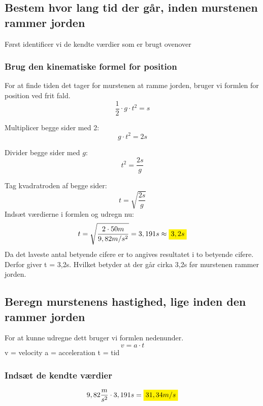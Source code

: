 \subsection{Bestem hvor lang tid der går, inden murstenen rammer jorden}

Først identificer vi de kendte værdier som er brugt ovenover

\subsubsection{Brug den kinematiske formel for position}
For at finde tiden det tager for murstenen at ramme jorden, bruger vi formlen for position ved frit fald.
\begin{equation*}
    \frac{1}{2}\cdot g\cdot t^{2}=s
\end{equation*}

Multiplicer begge sider med 2:
\[ g \cdot t^2 = 2s \]

Divider begge sider med \( g \):
\[ t^2 = \frac{2s}{g} \]

Tag kvadratroden af begge sider:
\[ t = \sqrt{\frac{2s}{g}} \]
Indsæt værdierne i formlen og udregn nu: 
\begin{equation*}
    t = \sqrt{\frac{2 \cdot 50m}{9,82m/s^2}} = 3,191 s \approx \mathcolorbox{yellow}{3,2s}
\end{equation*}
Da det laveste antal betyende cifere er to angives resultatet i to betyende cifere. Derfor giver t = 3,2s. Hvilket betyder at der går cirka 3,2s før murstenen rammer jorden.

\subsection{Beregn murstenens hastighed, lige inden den rammer jorden}
For at kunne udregne dett bruger vi formlen nedenunder.
\begin{equation*}
    v=a\cdot t
\end{equation*}
v = velocity\newline
a = acceleration\newline
t = tid
\subsubsection{Indsæt de kendte værdier}
\begin{equation*}
    9,82 \frac{m}{s^{2}}\cdot 3,191s = \mathcolorbox{yellow}{31,34 m/s}
\end{equation*}


\newpage